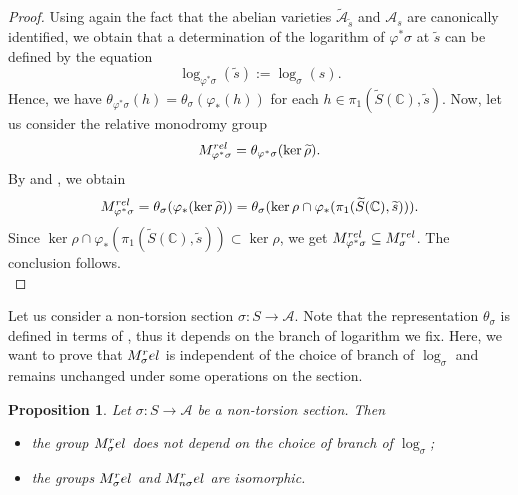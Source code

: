 \documentclass[10 pt,a4paper]{article}
\theoremstyle{plain}
\newtheorem{prop}[thm]{Proposition}
\theoremstyle{definition}
\theoremstyle{named}
\newcommand{\cA}{\mathcal A}
\newcommand{\bC}{\mathbb C}
\begin{document}
\begin{proof}
	Using again the fact that the abelian varieties $\widetilde{\cA}_{\widetilde{s}}$ and $\cA_s$ are canonically identified, we obtain that a determination of the logarithm of $\varphi^*\sigma$ at $\widetilde{s}$ can be defined by the equation
	\begin{equation}\label{eqn4}
		\log_{\varphi^*\sigma}(\widetilde{s}):=\log_\sigma(s).
	\end{equation}
	Hence, we have $\theta_{\varphi^*\sigma}(h)=\theta_\sigma(\varphi_*(h))$ for each $h \in \pi_1(\widetilde{S}(\bC),\widetilde{s})$. Now, let us consider the relative monodromy group
	\[
	M_{\varphi^*\sigma}^{\textnormal{rel}}=\theta_{\varphi^*\sigma}(\ker{\widetilde{\rho}}).
    \]
    By  and , we obtain
	\[
	M_{\varphi^*\sigma}^{\textnormal{rel}} = \theta_\sigma(\varphi_*(\ker{\widetilde{\rho}})) = \theta_{\sigma}(\ker{\rho} \cap \varphi_*(\pi_1(\widetilde{S}(\bC),\widetilde{s}))).
    \]
    Since $\ker{\rho} \cap \varphi_*(\pi_1(\widetilde{S}(\bC),\widetilde{s})) \subset \ker{\rho}$, we get $M_{\varphi^*\sigma}^{\textnormal{rel}} \subseteq M_{\sigma}^{\textnormal{rel}}$. The conclusion follows.\\
\end{proof}

Let us consider a non-torsion section $\sigma:S \rightarrow \cA$. Note that the representation $\theta_\sigma$ is defined in terms of , thus it depends on the branch of logarithm we fix. Here, we want to prove that $M_\sigma^\textnormal{rel}$ is independent of the choice of branch of $\log_\sigma$ and remains unchanged under some operations on the section.

\begin{prop}\label{relMonGrp}
	Let $\sigma: S \rightarrow \cA$ be a non-torsion section. Then
	\begin{itemize}
		\item[(i)] the group $M_\sigma^\textnormal{rel}$ does not depend on the choice of branch of $\log_\sigma$;
		
		\item[(ii)] the groups $M_\sigma^\textnormal{rel}$ and $M_{n\sigma}^\textnormal{rel}$ are isomorphic.
	\end{itemize}
\end{prop}
\end{document}
